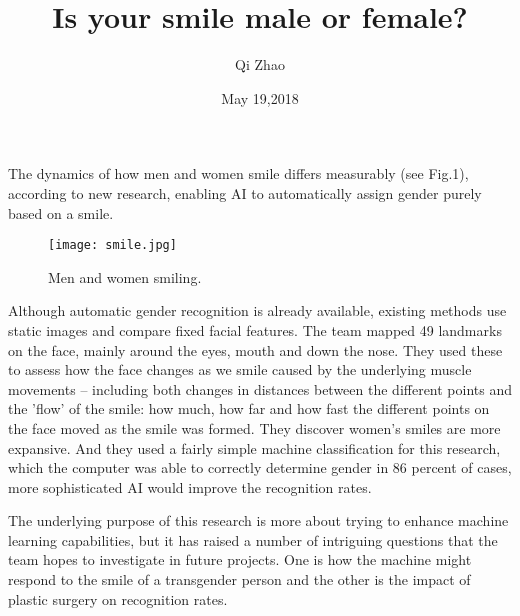 \documentclass{article}
\author{Qi Zhao}
\date{May 19,2018}
\title{Is your smile male or female?}
\begin{document}
\maketitle
\par The dynamics of how men and women smile differs measurably (see Fig.{\color{red}1}), according to new research, enabling AI to automatically assign gender purely based on a smile.

\begin{figure}[htbp]
\centering
\texttt{[image: smile.jpg]}
\caption{Men and women smiling.}
\label{1}
\end{figure}
\par Although automatic gender recognition is already available, existing methods use static images\cite{Pantic2004Facial} and compare fixed facial features. The team mapped 49 landmarks on the face, mainly around the eyes, mouth and down the nose. They used these to assess how the face changes as we smile caused by the underlying muscle movements -- including both changes in distances between the different points and the 'flow' of the smile: how much, how far and how fast the different points on the face moved as the smile was formed. They discover women's smiles are more expansive. And they used a fairly simple machine classification for this research, which the computer was able to correctly determine gender in 86 percent of cases, more sophisticated AI would improve the recognition rates.
\par The underlying purpose of this research is more about trying to enhance machine learning capabilities\cite{Alves2004Machine}, but it has raised a number of intriguing questions that the team hopes to investigate in future projects. One is how the machine might respond to the smile of a transgender person and the other is the impact of plastic surgery on recognition rates.


\end{document}
